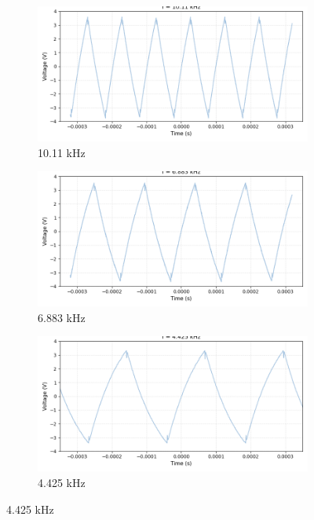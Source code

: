 \documentclass{article}
\begin{document}
\begin{figure}[H]
    \centering
    \begin{subfigure}[b]{0.32\textwidth}
        \includegraphics[width=\textwidth]{2.2.bb.png}
        \caption{10.11 kHz}
    \end{subfigure}
    \hfill
    \begin{subfigure}[b]{0.32\textwidth}
        \includegraphics[width=\textwidth]{2.2.bd.png}
        \caption{6.883 kHz}
    \end{subfigure}
    \hfill
    \begin{subfigure}[b]{0.32\textwidth}
        \includegraphics[width=\textwidth]{2.2.bc.png}
        \caption{4.425 kHz}
    \end{subfigure}
    

\end{figure}
\end{document}
